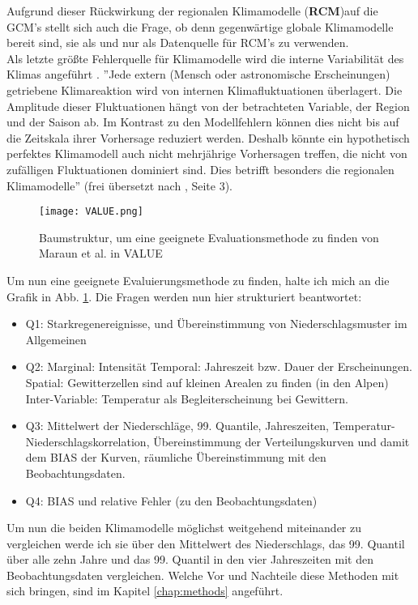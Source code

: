 Aufgrund dieser Rückwirkung der regionalen Klimamodelle (\textbf{RCM})auf die GCM's stellt sich auch die Frage, ob denn gegenwärtige globale Klimamodelle bereit sind, sie als und nur als Datenquelle für RCM's zu verwenden.\\
Als letzte größte Fehlerquelle für Klimamodelle wird die interne Variabilität des Klimas angeführt \cite[vgl.][]{maraun_2013}. ''Jede extern (Mensch oder astronomische Erscheinungen) getriebene Klimareaktion wird von internen Klimafluktuationen überlagert. Die Amplitude dieser Fluktuationen hängt von der betrachteten Variable, der Region und der Saison ab. Im Kontrast zu den Modellfehlern können dies nicht bis auf die Zeitskala ihrer Vorhersage reduziert werden. Deshalb könnte ein hypothetisch perfektes Klimamodell auch nicht mehrjährige Vorhersagen treffen, die nicht von zufälligen Fluktuationen dominiert sind. Dies betrifft besonders die regionalen Klimamodelle'' (frei übersetzt nach \cite{maraun_value}, Seite 3).\newline
\begin{figure}[h]
	\centering
	\texttt{[image: VALUE.png]}
	\caption{Baumstruktur, um eine geeignete Evaluationsmethode zu finden von Maraun et al. in VALUE \cite{maraun_value}}
	\label{fig:value}
\end{figure}

Um nun eine geeignete Evaluierungsmethode zu finden, halte ich mich an die Grafik in Abb. \ref{fig:value}. Die Fragen werden nun hier strukturiert beantwortet:
\begin{itemize}
	\item Q1: Starkregenereignisse, und Übereinstimmung von Niederschlagsmuster im Allgemeinen
	\item Q2:
		\subitem{*} Marginal: Intensität
		\subitem{*} Temporal: Jahreszeit bzw. Dauer der Erscheinungen.
		\subitem{*} Spatial: Gewitterzellen sind auf kleinen Arealen zu finden (in den Alpen)
		\subitem{*} Inter-Variable: Temperatur als Begleiterscheinung bei Gewittern.
	\item Q3: Mittelwert der Niederschläge, 99. Quantile, Jahreszeiten, Temperatur-Niederschlagskorrelation, Übereinstimmung der Verteilungskurven und damit dem BIAS der Kurven, räumliche Übereinstimmung mit den Beobachtungsdaten.
	\item Q4: BIAS und relative Fehler (zu den Beobachtungsdaten)
\end{itemize}

Um nun die beiden Klimamodelle möglichst weitgehend miteinander zu vergleichen werde ich sie über den Mittelwert des Niederschlags, das 99. Quantil über alle zehn Jahre und das 99. Quantil in den vier Jahreszeiten mit den Beobachtungsdaten vergleichen. Welche Vor und Nachteile diese Methoden mit sich bringen, sind im Kapitel \ref{chap:methods} angeführt.\\



